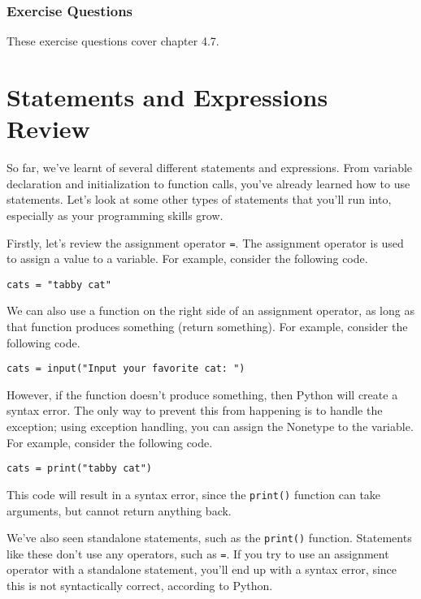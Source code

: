 \subsubsection*{Exercise Questions}
These exercise questions cover chapter 4.7.
\begin{Exercise}
\Question{}
\end{Exercise}
\section{Statements and Expressions Review}
So far, we've learnt of several different statements and expressions. From variable declaration and initialization to function calls, you've already learned how to use statements. Let's look at some other types of statements that you'll run into, especially as your programming skills grow.\par
Firstly, let's review the assignment operator \verb|=|. The assignment operator is used to assign a value to a variable. For example, consider the following code.\par
\begin{lstlisting}[style=pippython]
cats = "tabby cat"
\end{lstlisting}
We can also use a function on the right side of an assignment operator, as long as that function produces something (return something). For example, consider the following code.\par
\begin{lstlisting}[style=pippython]
cats = input("Input your favorite cat: ")
\end{lstlisting}
However, if the function doesn't produce something, then Python will create a syntax error. The only way to prevent this from happening is to handle the exception; using exception handling, you can assign the Nonetype to the variable. For example, consider the following code.\par
\begin{lstlisting}[style=pippython]
cats = print("tabby cat")
\end{lstlisting}
This code will result in a syntax error, since the \verb|print()| function can take arguments, but cannot return anything back.\par
We've also seen standalone statements, such as the \verb|print()| function. Statements like these don't use any operators, such as \verb|=|. If you try to use an assignment operator with a standalone statement, you'll end up with a syntax error, since this is not syntactically correct, according to Python.\par
